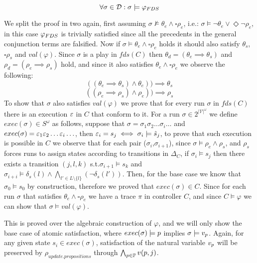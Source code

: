 \[\forall \sigma \in \mathcal{D}: \sigma \models \varphi_{FDS} \]

We split the proof in two again, first assuming $\sigma \not\models \theta_e \wedge \square \rho_e$, i.e.: $\sigma \models \neg\theta_e \vee \Diamond \neg\rho_e$, in this case $\varphi_{FDS}$ is trivially satisfied since all the precedents in the general conjunction terms are falsified. Now if $\sigma \models \theta_e \wedge \square \rho_e$ holds it should also satisfy $\theta_s$, $\square\rho_s$ and $val(\varphi)$. Since $\sigma$ is a play in $fds(C)$ then $\theta_d=(\theta_e \implies \theta_s)$ and $\rho_d=(\rho_e \implies \rho_s)$ hold, and since it also satisfies $\theta_e \wedge \square \rho_e$ we observe the following:
\[((\theta_e \implies \theta_s) \wedge \theta_e))\implies \theta_s\]
\[((\rho_e \implies \rho_s) \wedge \rho_e))\implies \rho_s\]
To show that $\sigma$ also satisfies $val(\varphi)$ we prove that for every run $\sigma$ in $fds(C)$ there is an execution $\varepsilon$ in $C$ that conform to it.
For a run $\sigma \in 2^{|\mathcal{V}|^{\omega}}$ we define $exec(\sigma) \in S^{\omega}$ as follows, suppose that $\sigma = \sigma_1 \sigma_2 \ldots \sigma_i \ldots$ and
$exec(\sigma)= \varepsilon_1 \varepsilon_2 \ldots \varepsilon_i \ldots$, then $\varepsilon_i = s_j \iff \sigma_i \models \hat{s}_{j}$, to prove that such execution is possible in $C$ we observe that for each pair ($\sigma_i$,$\sigma_{i+1}$), since $\sigma \models \rho_e \wedge \rho_s$, and $\rho_s$ forces
runs to assign states according to transitions in $\Delta_C$, if $\sigma_i \models s_j$ then there exists a transition $(j, l, k)$ s.t.$\sigma_{i+1} \models s_k$ and $\sigma_{i+i} \models \delta_s(l) \wedge \bigwedge_{l' \in L \setminus \{l\}}(\neg \delta_s(l'))$. Then, for the base case we know that $\sigma_0 \models s_0$ by construction, therefore we proved that $exec(\sigma) \in C$.
Since for each run $\sigma$ that satisfies $\theta_e \wedge \square \rho_e$ we have a trace $\pi$ in controller $C$, and since $C \models \varphi$ we can show that $\sigma \models val(\varphi)$.


This is proved over the algebraic construction of $\varphi$, and we will only show the base case of atomic satisfaction, where
$exec(\sigma) \models p$ implies $\sigma \models v_{p}$. Again, for any given state $s_i \in exec(\sigma)$, satisfaction of the natural variable $v_{p}$ will be preserved by  $\rho_{update.propositions}$ through $\bigwedge_{p \in \mathbb{P}}v(p,j)$.\\
\\

